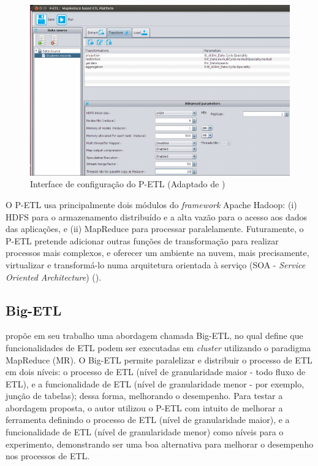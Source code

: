 \begin{figure}[h]
	\centering
	\includegraphics[scale=0.9]{fig/petl.png}
	\caption{Interface de configuração do P-ETL (Adaptado de \cite{bala:2014})}
	\label{petl}
\end{figure}

O P-ETL usa principalmente dois módulos do \textit{framework} Apache Hadoop: (i) HDFS para o armazenamento distribuído e a alta vazão para o acesso aos dados das aplicações, e (ii) MapReduce para processar paralelamente. Futuramente, o P-ETL pretende adicionar outras funções de transformação para realizar processos mais complexos, e oferecer um ambiente na nuvem, mais precisamente, virtualizar e transformá-lo numa arquitetura orientada à serviço (SOA - \textit{Service Oriented Architecture}) (\cite{bala:2014}).


\subsection{Big-ETL}

\cite{bala:2015} propõe em seu trabalho uma abordagem chamada Big-ETL, no qual define que funcionalidades de ETL podem ser executadas em \textit{cluster} utilizando o paradigma MapReduce (MR). O Big-ETL permite paralelizar e distribuir o processo de ETL em dois níveis: o processo de ETL (nível de granularidade maior - todo fluxo de ETL), e a funcionalidade de ETL (nível de granularidade menor - por exemplo, junção de tabelas); dessa forma, melhorando o desempenho. Para testar a abordagem proposta, o autor utilizou o P-ETL com intuito de melhorar a ferramenta definindo o processo de ETL (nível de granularidade maior), e a funcionalidade de ETL (nível de granularidade menor) como níveis para o experimento, demonstrando ser uma boa alternativa para melhorar o desempenho nos processos de ETL.

